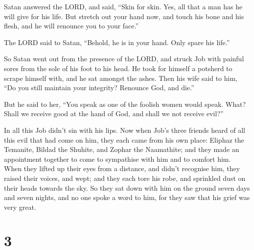  Satan answered the LORD, and said, ``Skin for skin. Yes,
all that a man has he will give for his life.  But stretch
out your hand now, and touch his bone and his flesh, and he will
renounce you to your face.''

 The LORD said to Satan, ``Behold, he is in your hand. Only
spare his life.''

 So Satan went out from the presence of the LORD, and struck
Job with painful sores from the sole of his foot to his head.
 He took for himself a potsherd to scrape himself with, and
he sat amongst the ashes.  Then his wife said to him, ``Do
you still maintain your integrity? Renounce God, and die.''

 But he said to her, ``You speak as one of the foolish
women would speak. What? Shall we receive good at the hand of God, and
shall we not receive evil?''

In all this Job didn't sin with his lips.  Now when Job's
three friends heard of all this evil that had come on him, they each
came from his own place: Eliphaz the Temanite, Bildad the Shuhite, and
Zophar the Naamathite; and they made an appointment together to come to
sympathise with him and to comfort him.  When they lifted
up their eyes from a distance, and didn't recognise him, they raised
their voices, and wept; and they each tore his robe, and sprinkled dust
on their heads towards the sky.  So they sat down with him
on the ground seven days and seven nights, and no one spoke a word to
him, for they saw that his grief was very great.

\hypertarget{section-2}{%
\section{3}\label{section-2}}

